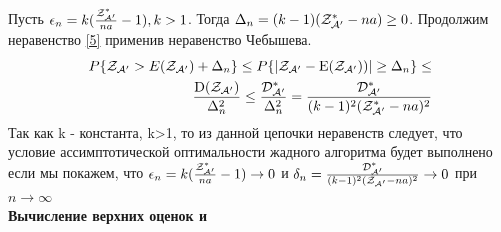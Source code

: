 \documentclass[a4paper, 14pt]{extarticle}
\begin{document}
Пусть $\epsilon_n = k(\frac{\text{$\mathcal{Z^*_{A'}}$}}{na}-1), k>1$.
Тогда $ \Delta_n = (k-1)(\text{$\mathcal{Z^*_{A'}}$}-na) \geq 0$.
Продолжим неравенство \ref{5} применив неравенство Чебышева.
\begin{equation}\label{6}
\begin{aligned}
P\{\text{$\mathcal{Z_{A'}}$}> E(\text{$\mathcal{Z_{A'}}$})+ \Delta_n\} \leq 
P\{|\text{$\mathcal{Z_{A'}}$}- \text{E($\mathcal{Z_{A'}}$)})| \geq \Delta_n\} \leq \\
\frac{\text{D($\mathcal{Z_{A'}}$)}}{\Delta^2_n} \leq
\frac{\text{$\mathcal{D^*_{A'}}$}}{\Delta^2_n} = 
\frac{\text{$\mathcal{D^*_{A'}}$}}{(k-1)^2(\text{$\mathcal{Z^*_{A'}}$}-na)^2}
\end{aligned}
\end{equation}
Так как k - константа, k>1, то из данной цепочки неравенств следует, что условие ассимптотической оптимальности жадного алгоритма будет выполнено если мы покажем, что
$ \epsilon_n=k(\frac{\text{$\mathcal{Z^*_{A'}}$}}{na}-1) \rightarrow 0$ и 
$ \delta_n = \frac{\text{$\mathcal{D^*_{A'}}$}}{(k-1)^2(\text{$\mathcal{Z_{A'}}$}-na)^2} \rightarrow 0$ при $ n \rightarrow \infty$\\

\textbf{Вычисление верхних оценок \topboundE и \topboundD}\\

\newcommand{\chanceLklesserX}{$\Phi_k(x)$}
\newcommand{\randomNormalValueE}{$l_k$}
\end{document}
